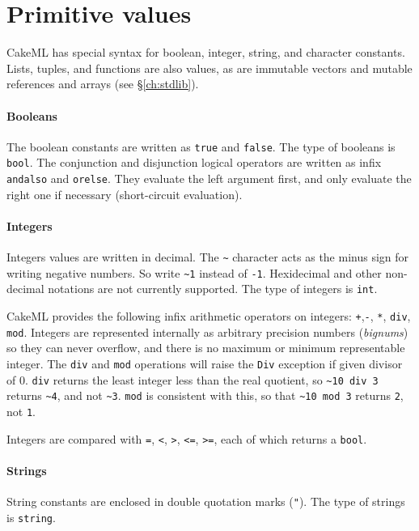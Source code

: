 \documentclass[12pt,a4paper]{book}
\begin{document}
\section{Primitive values}

CakeML has special syntax for boolean, integer, string, and character
constants. Lists, tuples, and functions are also values, as are immutable
vectors and mutable references and arrays (see \S\ref{ch:stdlib}).

\paragraph{Booleans} The boolean constants are written as \texttt{true} and
\texttt{false}. The type of booleans is \texttt{bool}. The conjunction and
disjunction logical operators are written as infix \texttt{andalso} and
\texttt{orelse}. They evaluate the left argument first, and only evaluate the
right one if necessary (short-circuit evaluation).

\paragraph{Integers} Integers values are written in decimal. The
\texttt{\textasciitilde} character acts as the minus sign for writing negative
numbers. So write \texttt{\textasciitilde 1} instead of \texttt{-1}. Hexidecimal and other
non-decimal notations are not currently supported. The type of integers is
\texttt{int}.

CakeML provides the following infix arithmetic operators on integers: \texttt{+},\texttt{-}, \texttt{*}, \texttt{div}, \texttt{mod}. Integers are represented internally as arbitrary precision numbers (\emph{bignums}) so they can never overflow, and there is no maximum or minimum representable integer. The \texttt{div} and \texttt{mod} operations will raise the \texttt{Div} exception if given divisor of 0. \texttt{div} returns the least integer less than the real quotient, so \texttt{\textasciitilde 10 div 3} returns \texttt{\textasciitilde 4}, and not \texttt{\textasciitilde 3}. \texttt{mod} is consistent with this, so that \texttt{\textasciitilde 10 mod 3} returns \texttt{2}, not \texttt{1}.

Integers are compared with \texttt{=}, \texttt{<}, \texttt{>}, \texttt{<=}, \texttt{>=}, each of which returns a \texttt{bool}.

\paragraph{Strings} String constants are enclosed in double quotation marks (\texttt{"}). The type of strings is \texttt{string}.
\end{document}
